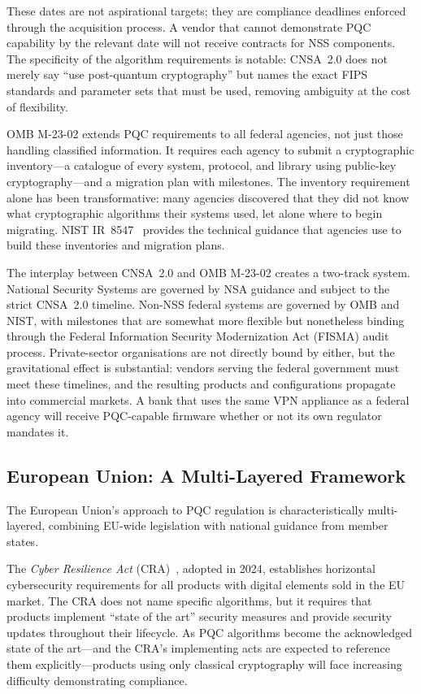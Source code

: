 These dates are not aspirational targets; they are compliance deadlines enforced through the acquisition process. A vendor that cannot demonstrate PQC capability by the relevant date will not receive contracts for NSS components. The specificity of the algorithm requirements is notable: CNSA~2.0 does not merely say ``use post-quantum cryptography'' but names the exact FIPS standards and parameter sets that must be used, removing ambiguity at the cost of flexibility.

OMB M-23-02 extends PQC requirements to all federal agencies, not just those handling classified information. It requires each agency to submit a cryptographic inventory---a catalogue of every system, protocol, and library using public-key cryptography---and a migration plan with milestones. The inventory requirement alone has been transformative: many agencies discovered that they did not know what cryptographic algorithms their systems used, let alone where to begin migrating. NIST IR~8547~\cite{NISTIR8547} provides the technical guidance that agencies use to build these inventories and migration plans.

The interplay between CNSA~2.0 and OMB M-23-02 creates a two-track system. National Security Systems are governed by NSA guidance and subject to the strict CNSA~2.0 timeline. Non-NSS federal systems are governed by OMB and NIST, with milestones that are somewhat more flexible but nonetheless binding through the Federal Information Security Modernization Act (FISMA) audit process. Private-sector organisations are not directly bound by either, but the gravitational effect is substantial: vendors serving the federal government must meet these timelines, and the resulting products and configurations propagate into commercial markets. A bank that uses the same VPN appliance as a federal agency will receive PQC-capable firmware whether or not its own regulator mandates it.

\subsection{European Union: A Multi-Layered Framework}
\label{subsec:eu-mandates}

The European Union's approach to PQC regulation is characteristically multi-layered, combining EU-wide legislation with national guidance from member states.

The \emph{Cyber Resilience Act} (CRA)~\cite{EUCyberResilienceAct}, adopted in 2024, establishes horizontal cybersecurity requirements for all products with digital elements sold in the EU market. The CRA does not name specific algorithms, but it requires that products implement ``state of the art'' security measures and provide security updates throughout their lifecycle. As PQC algorithms become the acknowledged state of the art---and the CRA's implementing acts are expected to reference them explicitly---products using only classical cryptography will face increasing difficulty demonstrating compliance.

